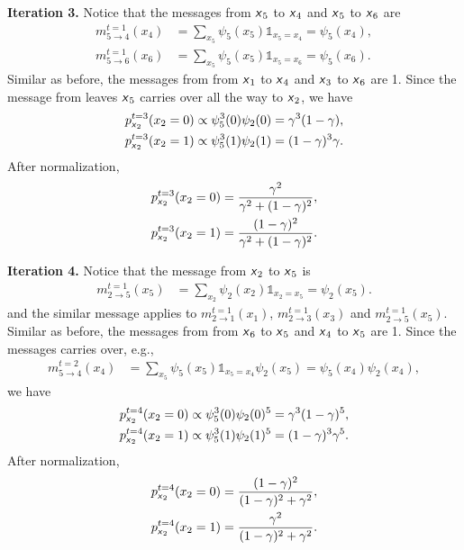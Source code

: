 \documentclass{article}
\newcommand{\s}[1]{\textsf{\textit{#1}}}
\begin{document}
\noindent
\textbf{Iteration 3.} Notice that the messages from $\s{x}_5$ to $\s{x}_4$ and
$\s{x}_5$ to $\s{x}_6$ are
%
\begin{align*}
	m^{t=1}_{5\to4}(x_4) &= \sum_{x_5}\psi_5(x_5)\mathds{1}_{x_5 = x_4} = \psi_5(x_4),\\
	m^{t=1}_{5\to6}(x_6) &= \sum_{x_5}\psi_5(x_5)\mathds{1}_{x_5 = x_6} = \psi_5(x_6).
\end{align*}
%
Similar as before, the messages from from $\s{x}_1$ to $\s{x}_4$ and $\s{x}_3$ to $\s{x}_6$ are 1.
%
Since the message from leaves $\s{x}_5$ carries over all the way to $\s{x}_2$, we have
%
\begin{align}
	p^{t=3}_{\s{x}_2}(x_2=0) \propto \psi_5^3(0)\psi_2(0) = \gamma^3(1 - \gamma),\\
	p^{t=3}_{\s{x}_2}(x_2=1) \propto \psi_5^3(1)\psi_2(1) = (1 - \gamma)^3\gamma.
\end{align}
%
After normalization,
\begin{align}
	p^{t=3}_{\s{x}_2}(x_2=0) = 
		\frac{\gamma^2}{\gamma^2+ (1 - \gamma)^2},\\
	p^{t=3}_{\s{x}_2}(x_2=1) =
		\frac{(1 - \gamma)^2}{{\gamma^2 + (1 - \gamma)^2}}.
\end{align}

\noindent
\textbf{Iteration 4.} Notice that the message from $\s{x}_2$ to $\s{x}_5$ is
\begin{align*}
	m^{t=1}_{2\to5}(x_5) &= \sum_{x_2}\psi_2(x_2)\mathds{1}_{x_2 = x_5} = \psi_2(x_5).
\end{align*}
%
and the similar message applies to $m^{t=1}_{2\to1}(x_1)$,
$m^{t=1}_{2\to3}(x_3)$ and $m^{t=1}_{2\to5}(x_5)$.
%
Similar as before, the messages from from $\s{x}_6$ to $\s{x}_5$
and $\s{x}_4$ to $\s{x}_5$ are 1.
%
Since the messages carries over, e.g.,
\begin{align*}
	m^{t=2}_{5\to4}(x_4) &= \sum_{x_5}\psi_5(x_5)\mathds{1}_{x_5 = x_4}\psi_2(x_5)
	= \psi_5(x_4)\psi_2(x_4),
\end{align*}
%
we have
\begin{align}
	p^{t=4}_{\s{x}_2}(x_2=0) \propto \psi_5^3(0)\psi_2(0)^5 = \gamma^3(1 - \gamma)^5,\\
	p^{t=4}_{\s{x}_2}(x_2=1) \propto \psi_5^3(1)\psi_2(1)^5 = (1 - \gamma)^3\gamma^5.
\end{align}
%
After normalization,
\begin{align}
	p^{t=4}_{\s{x}_2}(x_2=0) = 
		\frac{(1 - \gamma)^2}{(1 - \gamma)^2 + \gamma^2},\\
	p^{t=4}_{\s{x}_2}(x_2=1) =
		\frac{\gamma^2}{{(1 - \gamma)^2 + \gamma^2}}.
\end{align}
\\
\end{document}
